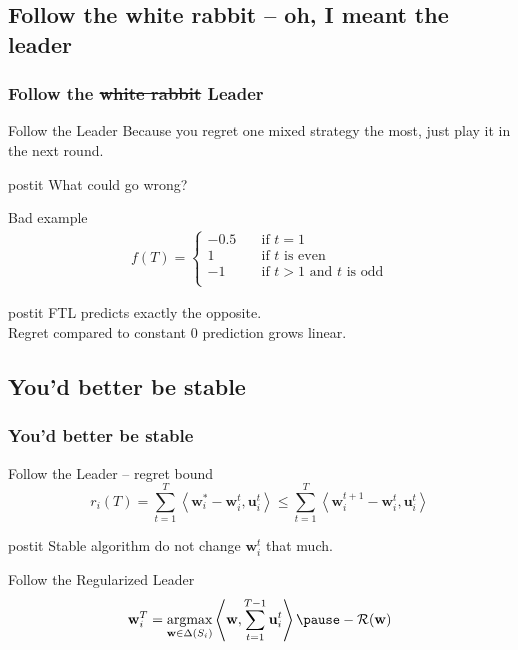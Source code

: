 \documentclass{beamer}
\renewcommand{\vec}[1]{\ensuremath{{\bf #1}}}
\newcommand{\dotp}[2]{\ensuremath{\left\langle #1, #2 \right\rangle}}
\newcommand{\mst}{\ensuremath{w}}
\newcommand{\mR}{\ensuremath{\mathcal{R}}}
\DeclareMathOperator*{\argmax}{argmax}
\begin{document}
\subsection{Follow the white rabbit -- oh, I meant the leader}
\begin{frame}
	\frametitle{Follow the \st{white rabbit} Leader}
	\begin{block}{Follow the Leader}
		Because you regret one mixed strategy the most, just play it in the next round.
	\end{block}
	\pause
	\begin{beamercolorbox}[sep=1em]{postit}
		What could go wrong?
	\end{beamercolorbox}
	\pause
	\begin{block}{Bad example}
		\begin{align*}
			 f(T) =
			\begin{cases}
			-0.5       & \quad \text{if } t = 1 \\
			1  & \quad \text{if } t \text{ is even}\\
			-1  & \quad \text{if } t > 1 \text{ and } t \text{ is odd}\\
			\end{cases}
		\end{align*}
		\begin{beamercolorbox}[sep=1em]{postit}
			FTL predicts exactly the opposite.\\
			Regret compared to constant 0 prediction grows linear.
		\end{beamercolorbox}
	\end{block}
\end{frame}


\subsection{You'd better be stable}
\begin{frame}
	\frametitle{You'd better be stable}
	\begin{block}{Follow the Leader -- regret bound}
		\begin{equation*}
			r_i(T) =  \sum_{t=1}^{T} \left< \mathbf{w}^*_i - \mathbf{w}^t_i, \mathbf{u}^t_i \right> \leq
			\sum_{t=1}^{T} \left< \mathbf{w}^{t+1}_i - \mathbf{w}^{t}_i, \mathbf{u}^t_i \right>
		\end{equation*}
	\end{block}
	\pause
	\begin{beamercolorbox}[sep=1em]{postit}
		Stable algorithm do not change $\mathbf{w}^t_i$ that much.
	\end{beamercolorbox}
	\pause
	\begin{block}{Follow the Regularized Leader }
	\begin{equation*}
	\vec{\mst}_i^T
	= \argmax_{\vec{\mst} \in \Delta(S_i)} \dotp{\vec{\mst}}{\sum_{t=1}^{T-1} \vec{u}_i^t} \pause-\mR(\vec{\mst})
	\end{equation*}
	\end{block}
\end{frame}
\end{document}
